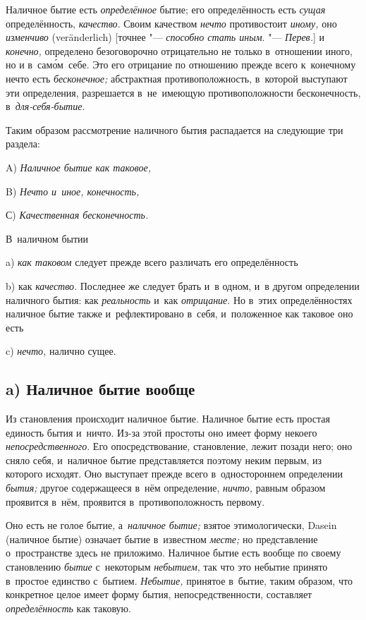 Наличное бытие есть {\em определённое} бытие; его определённость есть
{\em сущая} определённость, {\em качество}. Своим качеством {\em нечто}
противостоит {\em иному,} оно {\em изменчиво} (ver\-änder\-lich)
[точнее "--- {\em способно стать иным}. "--- {\em Перев.}] и {\em конечно,}
определено безоговорочно отрицательно не только в~отношении иного, но и
в~сам\'{о}м~себе. Это его отрицание по отношению прежде всего к~конечному нечто
есть {\em бесконечное;} абстрактная противоположность, в~которой выступают эти
определения, разрешается в~не~имеющую противоположности бесконечность,
в~{\em для-себя-бытие}.

Таким образом рассмотрение наличного бытия
распадается на следующие три раздела:

A) {\em Наличное бытие как таковое,}

B) {\em Нечто и~иное, конечность,}

С) {\em Качественная бесконечность.}


В~наличном бытии

a) {\em как таковом} следует прежде всего различать его определённость

b) как {\em качество}. Последнее же следует брать и~в одном, и~в другом
определении наличного бытия: как {\em реальность} и~как {\em отрицание}.
Но в~этих определённостях наличное бытие также и~рефлектировано в~себя,
и~положенное как таковое оно есть

c) {\em нечто,} налично сущее.

\subsection[a) Наличное бытие вообще]{a) Наличное бытие вообще}

Из становления происходит наличное бытие. Наличное бытие есть простая единость
бытия и~ничто. Из-за этой простоты оно имеет форму некоего
{\em непосредственного}. Его опосредствование, становление, лежит позади него;
оно сняло себя, и~наличное бытие представляется поэтому неким первым, из
которого исходят. Оно выступает прежде всего в~одностороннем определении
{\em бытия;} другое содержащееся в~нём определение, {\em ничто,} равным
образом проявится в~нём, проявится в~противоположность первому.

Оно есть не голое бытие, а~{\em наличное бытие;} взятое этимологически, Dasein
(наличное бытие) означает бытие в~известном {\em месте;} но представление
о~пространстве здесь не приложимо. Наличное бытие есть вообще по своему
становлению {\em бытие} с~некоторым {\em небытием,} так что это небытие принято
в~простое единство с~бытием. {\em Небытие,} принятое в~бытие, таким образом,
что конкретное целое имеет форму бытия, непосредственности, составляет
{\em определённость} как таковую.


